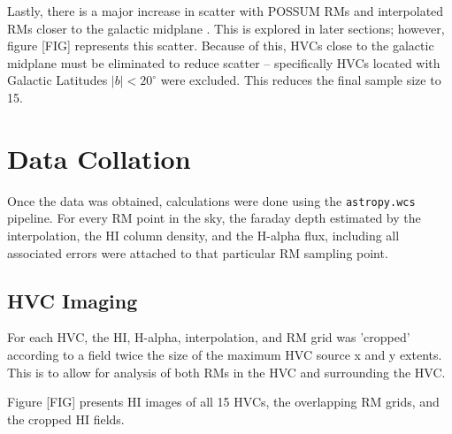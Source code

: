 Lastly, there is a major increase in scatter with POSSUM RMs and interpolated RMs closer to the galactic midplane \citep{ID21}. This is explored in later sections; however, figure [FIG] represents this scatter. Because of this, HVCs close to the galactic midplane must be eliminated to reduce scatter – specifically HVCs located with Galactic Latitudes $|b|<20^{\circ}$ were excluded. This reduces the final sample size to 15.

\section{Data Collation}
\label{sec:collation}

Once the data was obtained, calculations were done using the \verb|astropy.wcs| pipeline. For every RM point in the sky, the faraday depth estimated by the interpolation, the HI column density, and the H-alpha flux, including all associated errors were attached to that particular RM sampling point.

\subsection{HVC Imaging}
\label{ssec:hvc_snapshot}

For each HVC, the HI, H-alpha, interpolation, and RM grid was 'cropped' according to a field twice the size of the maximum HVC source x and y extents. This is to allow for analysis of both RMs in the HVC and surrounding the HVC.


Figure [FIG] presents HI images of all 15 HVCs, the overlapping RM grids, and the cropped HI fields.

